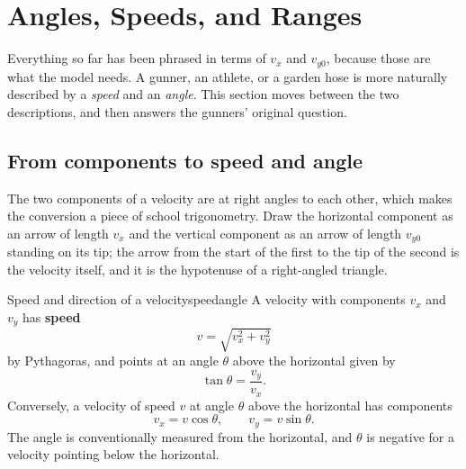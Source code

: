 \documentclass[11pt,twoside,openany]{book}
\begin{document}
\section{Angles, Speeds, and Ranges}
\label{sec:angles}

Everything so far has been phrased in terms of $v_x$ and $v_{y0}$, because those are what the model needs. A gunner, an athlete, or a garden hose is more naturally described by a \emph{speed} and an \emph{angle}. This section moves between the two descriptions, and then answers the gunners' original question.

\subsection{From components to speed and angle}

The two components of a velocity are at right angles to each other, which makes the conversion a piece of school trigonometry. Draw the horizontal component as an arrow of length $v_x$ and the vertical component as an arrow of length $v_{y0}$ standing on its tip; the arrow from the start of the first to the tip of the second is the velocity itself, and it is the hypotenuse of a right-angled triangle.

\begin{definition}{Speed and direction of a velocity}{speedangle}
A velocity with components $v_x$ and $v_y$ has \textbf{speed}
\[
v = \sqrt{v_x^{2} + v_y^{2}}
\]
by Pythagoras, and points at an angle $\theta$ above the horizontal given by
\[
\tan\theta = \frac{v_y}{v_x}.
\]
Conversely, a velocity of speed $v$ at angle $\theta$ above the horizontal has components
\[
v_x = v\cos\theta, \qquad v_y = v\sin\theta.
\]
The angle is conventionally measured from the horizontal, and $\theta$ is negative for a velocity pointing below the horizontal.
\end{definition}
\end{document}
